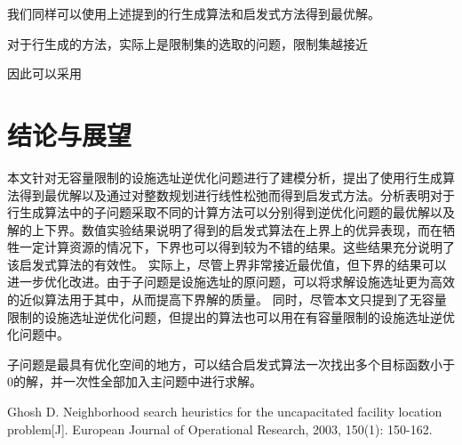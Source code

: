 \documentclass[UTF8]{article}
\begin{document}
我们同样可以使用上述提到的行生成算法和启发式方法得到最优解。

%
%

对于行生成的方法，实际上是限制集的选取的问题，限制集越接近

因此可以采用

\section{结论与展望}
本文针对无容量限制的设施选址逆优化问题进行了建模分析，提出了使用行生成算法得到最优解以及通过对整数规划进行线性松弛而得到启发式方法。分析表明对于行生成算法中的子问题采取不同的计算方法可以分别得到逆优化问题的最优解以及解的上下界。数值实验结果说明了得到的启发式算法在上界上的优异表现，而在牺牲一定计算资源的情况下，下界也可以得到较为不错的结果。这些结果充分说明了该启发式算法的有效性。
实际上，尽管上界非常接近最优值，但下界的结果可以进一步优化改进。由于子问题是设施选址的原问题，可以将求解设施选址更为高效的近似算法用于其中，从而提高下界解的质量。
同时，尽管本文只提到了无容量限制的设施选址逆优化问题，但提出的算法也可以用在有容量限制的设施选址逆优化问题中。

子问题是最具有优化空间的地方，可以结合启发式算法一次找出多个目标函数小于0的解，并一次性全部加入主问题中进行求解。


Ghosh D. Neighborhood search heuristics for the uncapacitated facility location problem[J]. European Journal of Operational Research, 2003, 150(1): 150-162.
\end{document}
